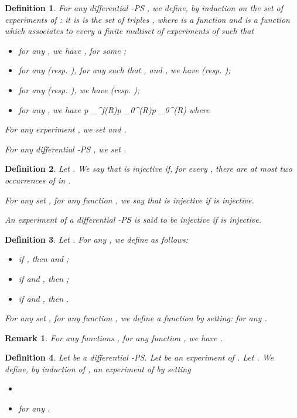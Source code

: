 \documentclass{article}
\theoremstyle{plain}
\newtheorem{definition}{Definition}
\newtheorem{rem}{Remark}
\newcommand{\cod}{\oc}
\newcommand{\contr}{\wn}
\newcommand{\portsatzerooftype}[2]{\mathcal{P}_0^{#1}(#2)}
\newcommand{\conclusionscirc}[1]{\mathcal{P}_\circ^{\textsf{f}}(#1)}
\begin{document}
\begin{definition}\label{defin: experiment in an untyped framework}
For any differential -PS , we define, by induction on  the set of \emph{experiments of }: it is is the set of triples , where  is a function  and  is a function which associates to every  a finite multiset of experiments of  such that
\begin{itemize}
\item for any , we have ,  for some ;
\item for any  (resp. ), for any  such that ,  and , we have  (resp. );
\item for any  (resp. ), we have  (resp. );
\item for any ,
we have p \in \conclusionscirc{R}p \in \portsatzerooftype{\contr}{R}p \in \portsatzerooftype{\cod}{R}
where 

\end{itemize}
For any experiment , we set  and .

For any differential -PS , we set .
\end{definition}

\begin{definition}\label{defin: injective}
Let . We say that  is \emph{injective} if, for every , there are at most two occurrences of  in . 

For any set , for any function , we say that  is \emph{injective} if  is injective.

An experiment  of a differential -PS  is said to be \emph{injective} if  is injective.
\end{definition}

\begin{definition}
Let . For any , we define  as follows:
\begin{itemize}
\item if , then  and ;
\item if  and , then ;
\item if  and , then .
\end{itemize}
For any set , for any function , we define a function  by setting:  for any .
\end{definition}

\begin{rem}
For any functions , for any function , we have .
\end{rem}

\begin{definition}
Let  be a differential -PS. Let  be an experiment of . Let . We define, by induction of , an experiment  of  by setting 
\begin{itemize}
\item 
\item  for any .
\end{itemize}
\end{definition}
\end{document}
